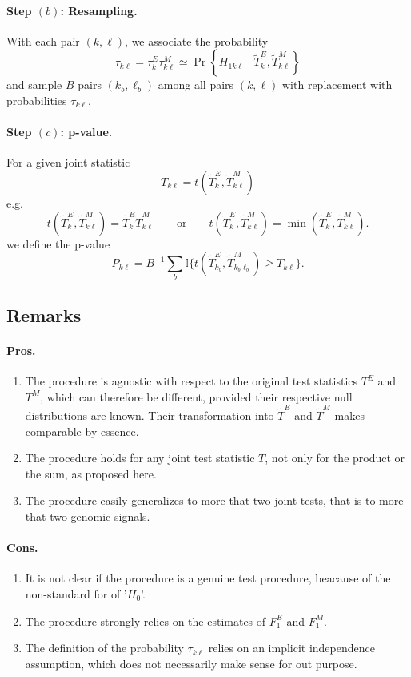 \documentclass[a4paper, 11pt]{article}
\newcommand{\Ibb}{\mathbb{I}}
\newcommand{\Tt}{\widetilde{T}}
\begin{document}
\paragraph{Step $(b)$: Resampling.} With each pair $(k, \ell)$, we associate the probability
$$
\tau_{k\ell} = \tau^E_k \tau^M_{k\ell} \simeq \Pr\left\{H_{1k\ell} \mid \Tt^E_k,  \Tt^M_{k\ell}\right\}
$$
and sample $B$ pairs $(k_b, \ell_b)$ among all pairs $(k, \ell)$ with replacement with probabilities $\tau_{k\ell}$. 

\paragraph{Step $(c)$: p-value.} For a given joint statistic 
$$
T_{k\ell} = t(\Tt^E_k, \Tt^M_{k\ell})
$$
e.g.
$$
t(\Tt^E_k, \Tt^M_{k\ell}) = \Tt^E_k \Tt^M_{k\ell}
\qquad \text{or} \qquad
t(\Tt^E_k, \Tt^M_{k\ell}) = \min(\Tt^E_k, \Tt^M_{k\ell}).
$$
we define the p-value
$$
P_{k\ell} = B^{-1} \sum_b \Ibb\{t(\Tt^E_{k_b}, \Tt^M_{k_b\ell_b}) \geq T_{k\ell}\}.
$$

\subsection{Remarks}

\paragraph{Pros.} 
\begin{enumerate}
 \item The procedure is agnostic with respect to the original test statistics $T^E$ and $T^M$, which can therefore be different, provided their respective null distributions are known. Their transformation into $\Tt^E$ and $\Tt^M$ makes comparable by essence.
 \item The procedure holds for any joint test statistic $T$, not only for the product or the sum, as proposed here.
 \item The procedure easily generalizes to more that two joint tests, that is to more that two genomic signals.
\end{enumerate}

\paragraph{Cons.} 
\begin{enumerate}
 \item It is not clear if the procedure is a genuine test procedure, beacause of the non-standard for of '$H_0$'.
 \item The procedure strongly relies on the estimates of $F^E_1$ and $F^M_1$.
 \item The definition of the probability $\tau_{k\ell}$ relies on an implicit independence assumption, which does not necessarily make sense for out purpose.
\end{enumerate}




\end{document}
